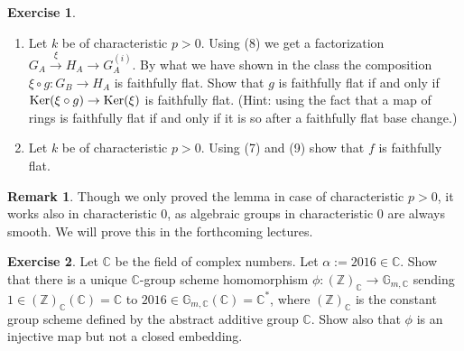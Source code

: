 \documentclass[12pt]{amsart}
\theoremstyle{plain}
\theoremstyle{definition}
\newtheorem{rmk}[thm]{Remark}
\newtheorem{ex}{Exercise}
\numberwithin{Aufgabe}{section}
\newcommand{\Ker}{{\rm Ker}}
\newcommand{\C}{{\mathbb C}}
\newcommand{\G}{{\mathbb G}}
\newcommand{\Z}{{\mathbb Z}}
\begin{document}
\begin{ex}
\begin{enumerate}
\item  Let $k$ be of characteristic $p>0$.  Using (8) we get a factorization $G_A\xrightarrow{\xi}H_A\to G_{A}^{(i)}$. By what we have shown in the class the composition $\xi\circ g: G_B\to H_A$ is faithfully flat. Show that $g$ is faithfully flat if and only if $\Ker(\xi\circ g)\to\Ker(\xi)$ is faithfully flat. (Hint: using the fact that a map of rings is faithfully flat if and only if it is so after a faithfully flat base change.) 
\item   Let $k$ be of characteristic $p>0$. Using (7) and (9) show that $f$ is faithfully flat. 
\end{enumerate}
\end{ex}
\begin{rmk} Though we only proved the lemma in case of characteristic $p>0$, it works also in characteristic $0$, as algebraic groups in characteristic 0 are always smooth. We will prove this in the forthcoming lectures.
\end{rmk}

\begin{ex} Let $\C$ be the field of complex numbers. Let $\alpha:=2016\in\C$. Show that there is a unique $\C$-group scheme homomorphism  $\phi:(\Z)_{\C}\to \G_{m,\C}$ sending $1\in(\Z)_{\C}(\C)=\C$ to $2016\in\G_{m,\C}(\C)=\C^*$, where $(\Z)_{\C}$ is the constant group scheme defined by the abstract additive group $\C$. Show also that $\phi$ is an injective map but not a closed embedding.
\end{ex}
\end{document}
